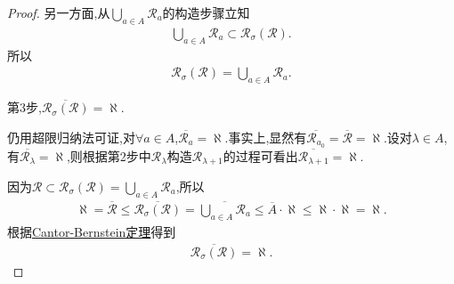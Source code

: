 \documentclass[../../main.tex]{subfiles}%
\begin{document}
\begin{proof}
另一方面,从$\bigcup\limits_{a\in A}\mathscr{R}_a$的构造步骤立知
\begin{align*}
\bigcup\limits_{a\in A}\mathscr{R}_a\subset\mathscr{R}_{\sigma}(\mathscr{R}).
\end{align*}
所以
\begin{align*}
\mathscr{R}_{\sigma}(\mathscr{R})=\bigcup\limits_{a\in A}\mathscr{R}_a.
\end{align*}

第3步,$\overline{\mathscr{R}_{\sigma}(\mathscr{R})}=\aleph$.

仍用超限归纳法可证,对$\forall a\in A$,$\overline{\mathscr{R}_a}=\aleph$.事实上,显然有$\overline{\mathscr{R}_{a_0}}=\overline{\mathscr{R}}=\aleph$.设对$\lambda\in A$,有$\overline{\mathscr{R}_{\lambda}}=\aleph$,则根据第2步中$\mathscr{R}_{\lambda}$构造$\mathscr{R}_{\lambda+1}$的过程可看出$\overline{\mathscr{R}_{\lambda+1}}=\aleph$.

因为$\mathscr{R}\subset\mathscr{R}_{\sigma}(\mathscr{R})=\bigcup\limits_{a\in A}\mathscr{R}_a$,所以
\begin{align*}
\aleph=\overline{\mathscr{R}}\leqslant\overline{\mathscr{R}_{\sigma}(\mathscr{R})}=\overline{\bigcup\limits_{a\in A}\mathscr{R}_a}\leqslant\overline{A}\cdot\aleph\leqslant\aleph\cdot\aleph=\aleph.
\end{align*}
根据\hyperref[Set-Theory-theorem:Cantor-Bernstein定理]{Cantor-Bernstein定理}得到
\begin{align*}
\overline{\mathscr{R}_{\sigma}(\mathscr{R})}=\aleph.
\end{align*}

\end{proof}
\end{document}
